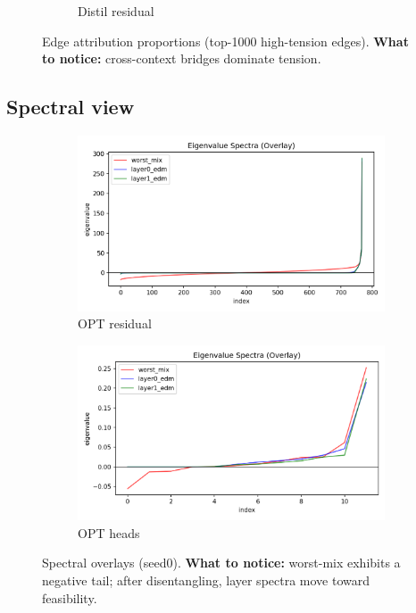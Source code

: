\documentclass[11pt]{article}
\newcommand{\1}{\mathbf{1}}
\begin{document}
\begin{figure}[t]
\begin{subfigure}[t]{0.32\textwidth}
\caption{Distil residual}
\end{subfigure}
\caption{Edge attribution proportions (top-1000 high-tension edges). \textbf{What to notice:} cross-context bridges dominate tension.}
\label{fig:edgeattr}
\end{figure}

\subsection{Spectral view}
\begin{figure}[t]
\centering
\begin{subfigure}[t]{0.48\textwidth}
\includegraphics[width=\linewidth]{figs/spectrum_overlay_facebook_opt-125m_residual_seed0.png}
\caption{OPT residual}
\end{subfigure}\hfill
\begin{subfigure}[t]{0.48\textwidth}
\includegraphics[width=\linewidth]{figs/spectrum_overlay_facebook_opt-125m_heads_seed0.png}
\caption{OPT heads}
\end{subfigure}
\caption{Spectral overlays (seed0). \textbf{What to notice:} worst-mix exhibits a negative tail; after disentangling, layer spectra move toward feasibility.}
\label{fig:spectra}
\end{figure}
\end{document}
